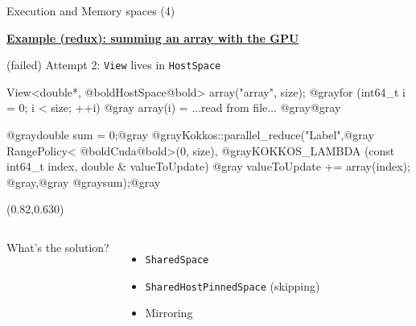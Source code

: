 \begin{frame}[fragile]{Execution and Memory spaces (4)}

  \ul{\textbf{Example (redux): summing an array with the GPU}}

  \vspace{7pt}

  \hspace{10pt}(failed) Attempt 2: \texttt{View} lives in \texttt{HostSpace}

  \vspace{3pt}

  \begin{code}[linebackgroundcolor={
        \btLstHL<2-3>{10}{red!20}
      },
      keywords={}]
View<double*, @boldHostSpace@bold> array("array", size);
@grayfor (int64_t i = 0; i < size; ++i) {@gray
  array(i) = ...read from file...
@gray}@gray

@graydouble sum = 0;@gray
@grayKokkos::parallel_reduce("Label",@gray
  RangePolicy< @boldCuda@bold>(0, size),
  @grayKOKKOS_LAMBDA (const int64_t index, double & valueToUpdate) {@gray
    valueToUpdate += array(index);
  @gray},@gray
  @graysum);@gray
  \end{code}

  \vspace{3pt}

  \begin{textblock*}{0.5\textwidth}(0.82\textwidth,0.630\textheight)
  \end{textblock*}

  \pause
  \pause
  \begin{columns}[t,onlytextwidth]
      What's the solution?
      \vspace{-25pt}
      \begin{itemize}
        \item{\texttt{SharedSpace}}
        \item{\texttt{SharedHostPinnedSpace} (skipping)}
        \item{Mirroring}
      \end{itemize}
  \end{columns}

\end{frame}


